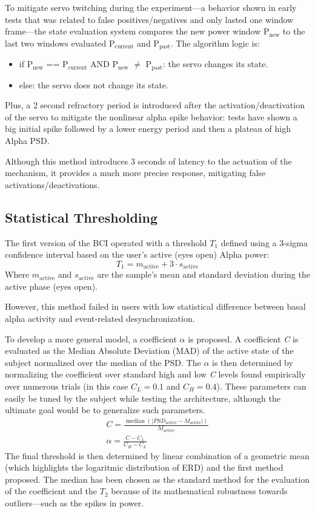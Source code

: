 \documentclass[journal, a4paper]{IEEEtran}
\begin{document}
To mitigate servo twitching during the experiment---a behavior shown in early tests that was related to false positives/negatives and only lasted one window frame---the state evaluation system compares the new power window $\text{P}_{\text{new}}$ to the last two windows evaluated $\text{P}_{\text{current}}$ and $\text{P}_{\text{past}}$. The algorithm logic is:
\begin{itemize}
    \item if $\text{P}_{\text{new}}$ == $\text{P}_{\text{current}}$ AND $\text{P}_{\text{new}}$ $\ne$ $\text{P}_{\text{past}}$: the servo changes its state.
    \item else: the servo does not change its state.
\end{itemize}
Plus, a 2 second refractory period is introduced after the activation/deactivation of the servo to mitigate the nonlinear alpha spike behavior: tests have shown a big initial spike followed by a lower energy period and then a plateau of high Alpha PSD.

Although this method introduces 3 seconds of latency to the actuation of the mechanism, it provides a much more precise response, mitigating false activations/deactivations.

\subsection{Statistical Thresholding}
The first version of the BCI operated with a threshold $T_1$ defined using a 3-sigma confidence interval based on the user's active (eyes open) Alpha power:
\begin{equation*}
T_1 = m_{\text{active}} + 3\cdot s_{\text{active}}
\end{equation*}
Where $m_{\text{active}}$ and $s_{\text{active}}$ are the sample's mean and standard deviation during the active phase (eyes open).

However, this method failed in users with low statistical difference between basal alpha activity and event-related desynchronization.

To develop a more general model, a coefficient $\alpha$ is proposed. A coefficient \textit{C} is evaluated as the Median Absolute Deviation (MAD) of the active state of the subject normalized over the median of the PSD. The $\alpha$ is then determined by normalizing the coefficient over standard high and low \textit{C} levels found empirically over numerous trials (in this case $C_L=0.1$ and $C_H=0.4$). These parameters can easily be tuned by the subject while testing the architecture, although the ultimate goal would be to generalize such parameters.
\begin{gather*}
    C = \frac{\operatorname{median}(|PSD_{\text{active}}-M_{\text{active}}|)}{M_{\text{active}}}\\
    \alpha=\frac{C-C_L}{C_H-C_L}
\end{gather*}
The final threshold is then determined by linear combination of a geometric mean (which highlights the logaritmic distribution of ERD) and the first method proposed. The median has been chosen as the standard method for the evaluation of the coefficient and the $T_2$ because of its mathematical robustness towards outliers---such as the spikes in power.
\end{document}
